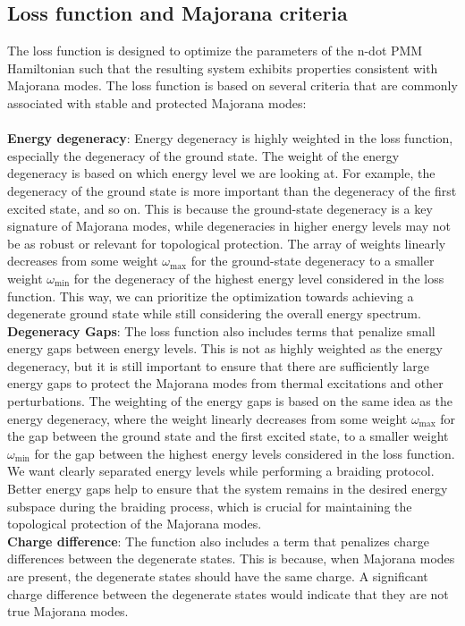 \subsection{Loss function and Majorana criteria}
The loss function is designed to optimize the parameters of the n-dot PMM Hamiltonian such that the resulting system exhibits properties consistent with Majorana modes. The loss function is based on several criteria that are commonly associated with stable and protected Majorana modes:\\ \\
\textbf{Energy degeneracy}: Energy degeneracy is highly weighted in the loss function, especially the degeneracy of the ground state. The weight of the energy degeneracy is based on which energy level we are looking at. For example, the degeneracy of the ground state is more important than the degeneracy of the first excited state, and so on. This is because the ground-state degeneracy is a key signature of Majorana modes, while degeneracies in higher energy levels may not be as robust or relevant for topological protection. The array of weights linearly decreases from some weight $\omega_\text{max}$ for the ground-state degeneracy to a smaller weight $\omega_\text{min}$ for the degeneracy of the highest energy level considered in the loss function. This way, we can prioritize the optimization towards achieving a degenerate ground state while still considering the overall energy spectrum.\\
\textbf{Degeneracy Gaps}: The loss function also includes terms that penalize small energy gaps between energy levels. This is not as highly weighted as the energy degeneracy, but it is still important to ensure that there are sufficiently large energy gaps to protect the Majorana modes from thermal excitations and other perturbations. The weighting of the energy gaps is based on the same idea as the energy degeneracy, where the weight linearly decreases from some weight $\omega_\text{max}$ for the gap between the ground state and the first excited state, to a smaller weight $\omega_\text{min}$ for the gap between the highest energy levels considered in the loss function. We want clearly separated energy levels while performing a braiding protocol. Better energy gaps help to ensure that the system remains in the desired energy subspace during the braiding process, which is crucial for maintaining the topological protection of the Majorana modes.\\
\textbf{Charge difference}: The function also includes a term that penalizes charge differences between the degenerate states. This is because, when Majorana modes are present, the degenerate states should have the same charge. A significant charge difference between the degenerate states would indicate that they are not true Majorana modes. \\
